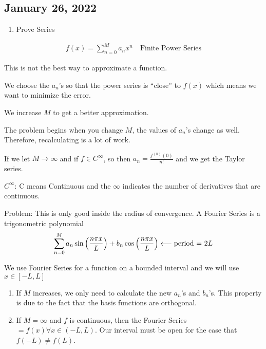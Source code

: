 \subsection*{January 26, 2022}
\begin{enumerate}
  \item Prove Series
\end{enumerate}

  \begin{align}
    f(x) = \sum^M_{n = 0} a_n x^n \quad \text{Finite Power Series}
  \end{align}

  This is not the best way to approximate a function.

  We choose the $a_n$'s so that the power series is ``close'' to $f(x)$ which means we want to minimize the error.

  We increase $M$ to get a better approximation.

  The problem begins when you change $M$, the values of $a_n$'s change as well. Therefore, recalculating is a lot of work.

  If we let $M \to \infty$ and if $f \in C^\infty$, so then $a_n = \frac{f^{(n)}(0)}{n!}$ and we get the Taylor series.

  \note $C^\infty$: C means Continuous and the $\infty$ indicates the number of derivatives that are continuous.

  Problem: This is only good inside the radius of convergence.
  \bigbreak
  A Fourier Series is a trigonometric polynomial
  \begin{align}
    \sum_{n = 0}^M a_n \sin \Big( \frac{n \pi x}{L} \Big) + b_n \cos \Big( \frac{n \pi x}{L} \Big) \longleftarrow \text{period = } 2L
  \end{align}

  We use Fourier Series for a function on a bounded interval and we will use $x \in [-L, L]$

  \begin{enumerate}
    \item If $M$ increases, we only need to calculate the new $a_n$'s and $b_n$'s. This property is due to the fact that the basis functions are orthogonal.

    \item If $M = \infty$ and $f$ is continuous, then the Fourier Series $= f(x) \forall x \in (-L, L)$. Our interval must be open for the case that $f(-L) \neq f(L)$.
  \end{enumerate}

